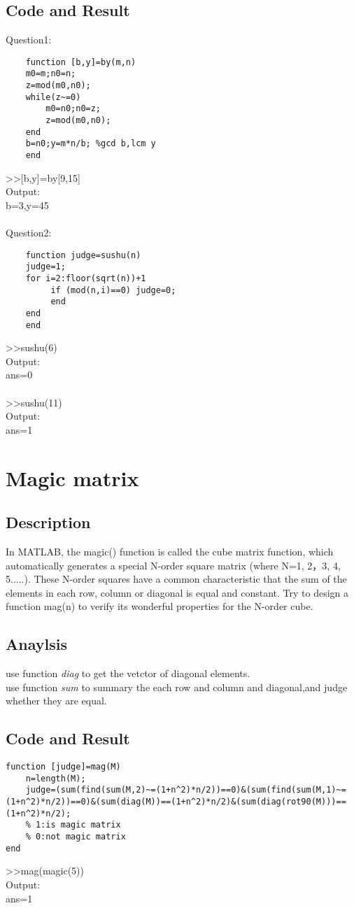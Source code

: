 \documentclass[UTF8,a4paper]{article}
\begin{document}
\subsection{Code and Result}
\noindent Question1:\\
\begin{lstlisting}
    function [b,y]=by(m,n)
    m0=m;n0=n;
    z=mod(m0,n0);
    while(z~=0)
        m0=n0;n0=z;
        z=mod(m0,n0);
    end
    b=n0;y=m*n/b; %gcd b,lcm y
    end
\end{lstlisting}
>>[b,y]=by[9,15]\\
Output:\\
b=3,y=45\\\\
Question2:\\
\begin{lstlisting}
    function judge=sushu(n)
    judge=1;
    for i=2:floor(sqrt(n))+1
         if (mod(n,i)==0) judge=0;
         end
    end
    end
\end{lstlisting}
>>sushu(6)\\
Output:\\
ans=0\\\\
>>sushu(11)\\
Output:\\
ans=1\\
\section{Magic matrix}
\subsection{Description}
In MATLAB, the magic() function is called the cube matrix function, which automatically generates a special N-order square matrix (where N=1, 2，3, 4, 5.....). These N-order squares have a common characteristic that the sum of the elements in each row, column or diagonal is equal and constant. Try to design a function mag(n) to verify its wonderful properties for the N-order cube.
\subsection{Anaylsis}
\noindent use function \textit{diag} to get the vetctor of diagonal elements.\\
use function \textit{sum} to summary the each row and column and diagonal,and judge whether they are equal.
\subsection{Code and Result}
\begin{lstlisting}
function [judge]=mag(M)
    n=length(M);
    judge=(sum(find(sum(M,2)~=(1+n^2)*n/2))==0)&(sum(find(sum(M,1)~=(1+n^2)*n/2))==0)&(sum(diag(M))==(1+n^2)*n/2)&(sum(diag(rot90(M)))==(1+n^2)*n/2);
    % 1:is magic matrix
    % 0:not magic matrix
end  
\end{lstlisting}
>>mag(magic(5))\\
Output:\\
ans=1
\end{document}
